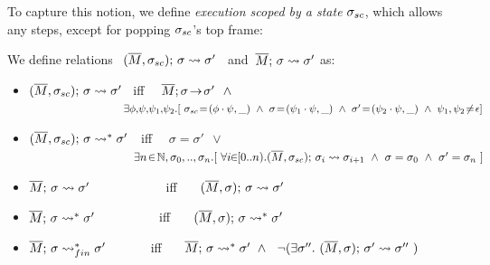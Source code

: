  

To capture this  notion, we define  %
{\emph{execution scoped by a state} $\sigma_{sc}$, which %
allows any steps, except for popping   $\sigma_{sc}$'s top frame:}
 
 
\begin{definition}
\label{def:shallow:term}
We define relations \    $(\overline{M}, \sigma_{sc});\, {\sigma} \rightsquigarrow \sigma'$ \ and\  $\overline{M};\, {\sigma} \rightsquigarrow \sigma'$ as:

\begin{itemize}
\item
 $(\overline{M}, \sigma_{sc});\, {\sigma} \rightsquigarrow \sigma'$ \    iff \ \   $\leadstoOrig {\Mtwo} {\sigma} {\sigma'} %
\ \  \wedge $\\
$\strut  \hspace{2.9cm}\ \      \exists \phi,\!\psi,\!\psi_1,\!\psi_2.[ \  \sigma\bd\! =\! (\phi\cdot\psi,\_) \ \wedge \ \sigma\! =\! (\psi_1\cdot \psi, \_)
\ \wedge\ \sigma'\! =\! (\psi_2\cdot \psi, \_)\ \wedge\ {\psi_1,\psi_2\!\neq\! \epsilon}] $ 
\item
 $(\overline{M}, \sigma_{sc});\, {\sigma} \rightsquigarrow^* \sigma'$\ \  iff \ \ $\sigma=\sigma'\ \ \vee$\\
$\strut  \hspace{3cm}\ \ \exists n\!\in\!\mathbb{N},\sigma_0,..,\sigma_n.[\ \forall i\!\! \in\!\! [0..n).\leadstoBoundedThree {\Mtwo}  {\sigma_i}  {\sigma\bd} {\sigma_{i+1}} \ \wedge\ \sigma=\sigma_0\ \wedge\ \sigma'=\sigma_n\ ]$
 \item
{  $\overline{M};\, {\sigma} \rightsquigarrow \sigma'$\ \  \ \ \ \ \ \   \ \ \ \ iff \ \ \ $(\overline{M}, \sigma);\, {\sigma} \rightsquigarrow \sigma'$}
  \item
{  $\overline{M};\, {\sigma} \rightsquigarrow^* \sigma'  $\ \ \ \ \ \ \ \ \   \ iff \ \ \ $(\overline{M}, \sigma);\, {\sigma} \rightsquigarrow^* \sigma'$}\ \  
\item
{  $\overline{M};\, {\sigma} \rightsquigarrow^*_{fin} \sigma'  $\ \ \ \ \ \   \ iff \ \ \ $\overline{M};\, {\sigma} \rightsquigarrow^* \sigma'  \ \wedge\ \ \neg(\exists 
\sigma''.\ (\overline{M}, \sigma);\, {\sigma'} \rightsquigarrow \sigma'' \ )$ }
 \end{itemize}
\end{definition}
 

